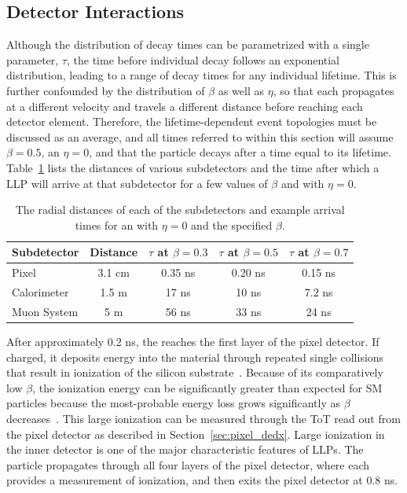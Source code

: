 \subsection{Detector Interactions}
\label{sec:rh_interactions}

Although the distribution of decay times can be parametrized with a single parameter, $\tau$, the time before individual \rhadrons decay follows an exponential distribution, leading to a range of decay times for any individual lifetime.
This is further confounded by the distribution of $\beta$ as well as $\eta$, so that each \rhadron propagates at a different velocity and travels a different distance before reaching each detector element.
Therefore, the lifetime-dependent event topologies must be discussed as an average, and all times referred to within this section will assume $\beta = 0.5$, an $\eta = 0$, and that the particle decays after a time equal to its lifetime.
Table~\ref{tab:detector_times} lists the distances of various subdetectors and the time after which a \ac{LLP} will arrive at that subdetector for a few values of $\beta$ and with $\eta = 0$.

\begin{table}[h!]
\begin{tabular}{lcccc}
\hline
Subdetector & Distance & $\tau$ at $\beta = 0.3$ & $\tau$ at $\beta = 0.5$ & $\tau$ at $\beta = 0.7$ \\
\hline
Pixel & 3.1 cm & 0.35 ns & 0.20 ns & 0.15 ns\\
Calorimeter & 1.5 m & 17 ns & 10 ns & 7.2 ns \\
Muon System & 5 m & 56 ns & 33 ns & 24 ns \\
\hline
\end{tabular}
\caption{The radial distances of each of the subdetectors and example arrival times for an \rhadron with $\eta = 0$ and the specified $\beta$.}
\label{tab:detector_times}
\end{table}

After approximately 0.2 ns, the \rhadron reaches the first layer of the pixel detector. If charged, it deposits energy into the material through repeated single collisions that result in ionization of the silicon substrate~\cite{pdg}. 
Because of its comparatively low $\beta$, the ionization energy can be significantly greater than expected for \ac{SM} particles because the most-probable energy loss grows significantly as $\beta$ decreases~\cite{pdg}.
This large ionization can be measured through the \ac{ToT} read out from the pixel detector as described in Section~\ref{sec:pixel_dedx}.
Large ionization in the inner detector is one of the major characteristic features of \acp{LLP}.
The particle propagates through all four layers of the pixel detector, where each provides a measurement of ionization, and then exits the pixel detector at 0.8 ns.

